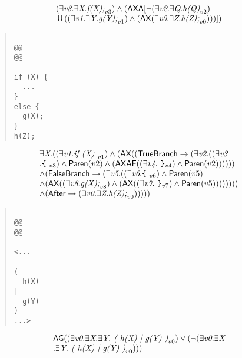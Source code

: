 \documentclass{article}
\newcommand{\U}{\,\mbox{\sf{U}}\,}
\newcommand{\A}{\mbox{\sf{A}}}
\newcommand{\AX}{\mbox{\sf{AX}}}
\newcommand{\AF}{\mbox{\sf{AF}}}
\newcommand{\AG}{\mbox{\sf{AG}}}
\newcommand{\mita}[1]{\mbox{\it{{#1}}}}
\newcommand{\msf}[1]{\mbox{\sf{{#1}}}}
\newcommand{\ttlb}{\mbox{\tt \char'173}}
\newcommand{\ttrb}{\mbox{\tt \char'175}}
\begin{document}
\[\begin{array}{l}
(\exists \mita{v3} . \exists \mita{X} . \mita{f(X);}_{v3}) \wedge (\AX\A[\neg (\exists \mita{v2} . \exists \mita{Q} . \mita{h(Q)}_{v2})\\ \U ((\exists \mita{v1} . \exists \mita{Y} . \mita{g(Y);}_{v1}) \wedge (\AX(\exists \mita{v0} . \exists \mita{Z} . \mita{h(Z);}_{v0})))]
)
\end{array}\]

\begin{quote}\begin{verbatim}

@@
@@

if (X) {
  ...
}
else {
  g(X);
}
h(Z);
\end{verbatim}\end{quote}

\[\begin{array}{l}
\exists \mita{X} . ((\exists \mita{v1} . \mita{if (X) }_{v1}) \wedge (\AX((\msf{TrueBranch} \rightarrow (\exists \mita{v2} . ((\exists \mita{v3}\\ . \mita{{\ttlb}
  }_{v3}) \wedge \msf{Paren}(v2) \wedge (\AX\AF((\exists \mita{v4} . \mita{
{\ttrb}}_{v4}) \wedge \msf{Paren}(v2))))))\\ \wedge (\msf{FalseBranch} \rightarrow (\exists \mita{v5} . ((\exists \mita{v6} . \mita{{\ttlb}
  }_{v6}) \wedge \msf{Paren}(v5)\\ \wedge (\AX((\exists \mita{v8} . \mita{g(X);}_{v8}) \wedge (\AX((\exists \mita{v7} . \mita{
{\ttrb}}_{v7}) \wedge \msf{Paren}(v5))))))))\\ \wedge (\msf{After} \rightarrow (\exists \mita{v0} . \exists \mita{Z} . \mita{h(Z);}_{v0})))))
\end{array}\]

\begin{quote}\begin{verbatim}

@@
@@

<...
  
(
  h(X)
|
  g(Y)
)
...>
\end{verbatim}\end{quote}

\[\begin{array}{l}
\AG((\exists \mita{v0} . \exists \mita{X} . \exists \mita{Y} . \mita{
(
h(X)
|
g(Y)
)}_{v0}) \vee (\neg (\exists \mita{v0} . \exists \mita{X}\\ . \exists \mita{Y} . \mita{
(
h(X)
|
g(Y)
)}_{v0})))
\end{array}\]
\end{document}
